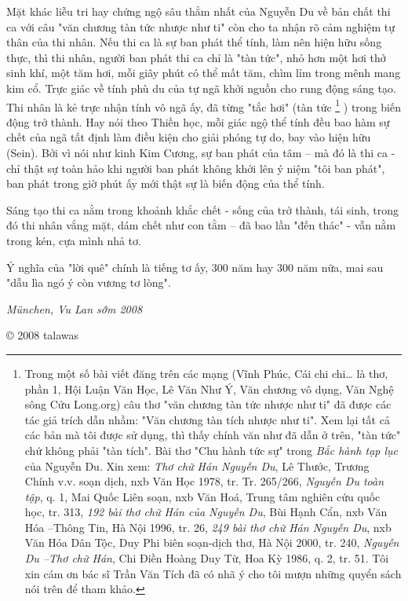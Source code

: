 \documentclass[../main.tex]{subfiles}
\begin{document}
\begin{multicols}{2}
Mặt khác liễu tri hay chứng ngộ sâu thẳm nhất của Nguyễn Du về bản chất thi ca với câu "văn chương tàn tức nhược như ti" còn cho ta nhận rõ cảm nghiệm tự thân của thi nhân. Nếu thi ca là sự ban phát thể tính, làm nên hiện hữu sống thực, thì thi nhân, người ban phát thi ca chỉ là "tàn tức", nhỏ hơn một hơi thở sinh khí, một tăm hơi, mỗi giây phút có thể mất tăm, chìm lỉm trong mênh mang kim cổ. Trực giác về tính phù du của tự ngã khởi nguồn cho rung động sáng tạo. Thi nhân là kẻ trực nhận tính vô ngã ấy, đã từng "tắc hơi" (tàn tức \footnote{
Trong một số bài viết đăng trên các mạng (Vĩnh Phúc, Cái chi chi… là thơ, phần 1, Hội Luận Văn Học, Lê Văn Như  Ý, Văn chương vô dụng, Văn Nghệ sông Cửu Long.org) câu thơ "văn chương tàn tức nhược như ti" đã được các tác giả trích dẫn nhầm: "Văn chương tàn tích nhược như ti". Xem lại tất cả các bản mà tôi được sử dụng, thì thấy chính văn như đã dẫn ở trên, "tàn tức" chứ không phải "tàn tích". 
Bài thơ "Chu hành tức sự" trong \textit{Bắc hành tạp lục} của Nguyễn Du. Xin xem: \textit{Thơ chữ Hán Nguyễn Du}, Lê Thước, Trương Chính v.v. soạn dịch, nxb Văn Học 1978, tr. Tr. 265/266, \textit{Nguyễn Du toàn tập}, q. 1, Mai Quốc Liên soạn, nxb Văn Hoá, Trung tâm nghiên cứu quốc học, tr. 313, \textit{192 bài thơ chữ Hán của Nguyễn Du}, Bùi Hạnh Cẩn, nxb Văn Hóa –Thông Tin, Hà Nội 1996, tr. 26, \textit{249 bài thơ chữ Hán Nguyễn Du}, nxb Văn Hóa Dân Tộc, Duy Phi biên soạn-dịch thơ, Hà Nội 2000, tr. 240, \textit{Nguyễn Du –Thơ chữ  Hán}, Chi Điền Hoàng Duy Từ, Hoa Kỳ 1986, q. 2, tr. 51. Tôi xin cám ơn bác sĩ Trần Văn Tích đã có nhã ý cho tôi mượn những quyển sách nói trên để tham khảo.} ) trong biến động trở thành. Hay nói theo Thiền học, mỗi giác ngộ thể tính đều bao hàm sự chết của ngã tất định làm điều kiện cho giải phóng tự do, bay vào hiện hữu (Sein). Bởi vì nói như kinh Kim Cương, sự ban phát của tâm – mà đó là thi ca - chỉ thật sự toàn hảo khi người ban phát không khởi lên ý niệm "tôi ban phát", ban phát trong giờ phút ấy mới thật sự là biến động của thể tính.  
 
Sáng tạo thi ca nằm trong khoảnh khắc chết - sống của trở thành, tái sinh, trong đó thi nhân vắng mặt, dám chết như con tằm – đã bao lần "đến thác" - vẫn nằm trong kén, cựa mình nhả tơ.    
 
Ý nghĩa của "lời quê" chính là tiếng tơ ấy, 300 năm hay 300 năm nữa, mai sau "dẫu lìa ngó ý còn vương tơ lòng". 
 
\textit{München, Vu Lan sớm 2008} 
 
© 2008 talawas



\end{multicols}
\end{document}
